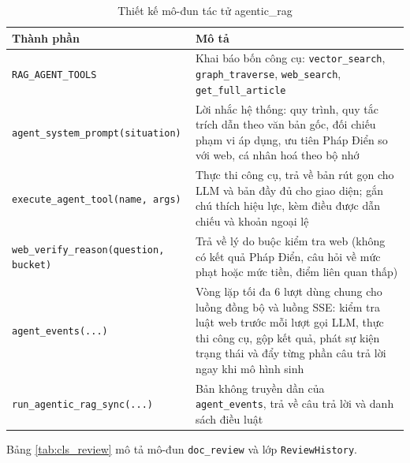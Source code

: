\documentclass[../DoAn.tex]{subfiles}
\begin{document}
\begin{table}[H]
\centering
\caption{Thiết kế mô-đun tác tử agentic\_rag}
\label{tab:cls_agent}
\begin{tabular}{|L{4.6cm}|L{9.4cm}|}
\hline
\textbf{Thành phần} & \textbf{Mô tả} \\ \hline
\texttt{RAG\_AGENT\_TOOLS} & Khai báo bốn công cụ: \texttt{vector\_search}, \texttt{graph\_traverse}, \texttt{web\_search}, \texttt{get\_full\_article} \\ \hline
\texttt{agent\_system\_prompt(}\allowbreak\texttt{situation)} & Lời nhắc hệ thống: quy trình, quy tắc trích dẫn theo văn bản gốc, đối chiếu phạm vi áp dụng, ưu tiên Pháp Điển so với web, cá nhân hoá theo bộ nhớ \\ \hline
\texttt{execute\_agent\_tool(}\allowbreak\texttt{name,}\allowbreak\texttt{ args)} & Thực thi công cụ, trả về bản rút gọn cho LLM và bản đầy đủ cho giao diện; gắn chú thích hiệu lực, kèm điều được dẫn chiếu và khoản ngoại lệ \\ \hline
\texttt{web\_verify\_reason(}\allowbreak\texttt{question,}\allowbreak\texttt{ bucket)} & Trả về lý do buộc kiểm tra web (không có kết quả Pháp Điển, câu hỏi về mức phạt hoặc mức tiền, điểm liên quan thấp) \\ \hline
\texttt{agent\_events(}\allowbreak\texttt{...)} & Vòng lặp tối đa 6 lượt dùng chung cho luồng đồng bộ và luồng SSE: kiểm tra luật web trước mỗi lượt gọi LLM, thực thi công cụ, gộp kết quả, phát sự kiện trạng thái và đẩy từng phần câu trả lời ngay khi mô hình sinh \\ \hline
\texttt{run\_agentic\_rag\_sync(}\allowbreak\texttt{...)} & Bản không truyền dần của \texttt{agent\_events}, trả về câu trả lời và danh sách điều luật \\ \hline
\end{tabular}
\end{table}

Bảng \ref{tab:cls_review} mô tả mô-đun \texttt{doc\_review} và lớp \texttt{ReviewHistory}.
\end{document}
